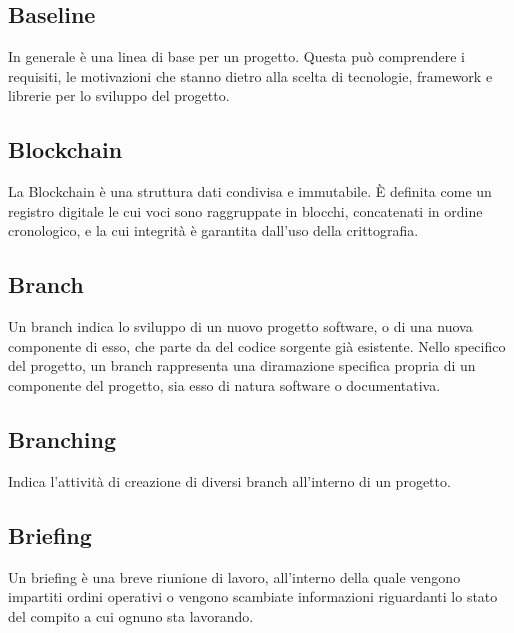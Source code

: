 
\subsection*{Baseline}
In generale è una linea di base per un progetto. Questa può comprendere i requisiti, le motivazioni che stanno dietro alla scelta di tecnologie, framework e librerie per lo sviluppo del progetto.

\subsection*{Blockchain}
La Blockchain è una struttura dati condivisa e immutabile. È definita come un registro digitale le cui voci sono raggruppate in blocchi, concatenati in ordine cronologico, e la cui integrità è garantita dall'uso della crittografia.

\subsection*{Branch}
Un branch indica lo sviluppo di un nuovo progetto software, o di una nuova componente di esso, che parte da del codice sorgente già esistente. Nello specifico del progetto, un branch rappresenta una diramazione specifica propria di un componente del progetto, sia esso di natura software o documentativa.

\subsection*{Branching}
Indica l'attività di creazione di diversi branch all'interno di un progetto.

\subsection*{Briefing}
Un briefing è una breve riunione di lavoro, all'interno della quale vengono impartiti ordini operativi o vengono scambiate informazioni riguardanti lo stato del compito a cui ognuno sta lavorando.

